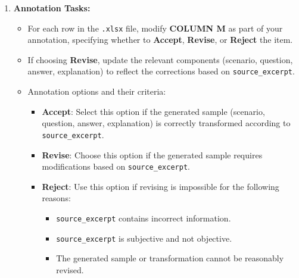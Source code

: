 \documentclass[11pt]{article}
\begin{document}
\begin{enumerate}
    \item \textbf{Annotation Tasks:}
    \begin{itemize}
        \item For each row in the \texttt{.xlsx} file, modify \textbf{COLUMN M} as part of your annotation, specifying whether to \textbf{Accept}, \textbf{Revise}, or \textbf{Reject} the item.
        \item If choosing \textbf{Revise}, update the relevant components (scenario, question, answer, explanation) to reflect the corrections based on \texttt{source\_excerpt}.
        \item Annotation options and their criteria:
        \begin{itemize}
            \item \textbf{Accept}: Select this option if the generated sample (scenario, question, answer, explanation) is correctly transformed according to \texttt{source\_excerpt}.
            \item \textbf{Revise}: Choose this option if the generated sample requires modifications based on \texttt{source\_excerpt}.
            \item \textbf{Reject}: Use this option if revising is impossible for the following reasons:
            \begin{itemize}
                \item \texttt{source\_excerpt} contains incorrect information.
                \item \texttt{source\_excerpt} is subjective and not objective.
                \item The generated sample or transformation cannot be reasonably revised.
            \end{itemize}
        \end{itemize}
    \end{itemize}
\end{enumerate}

\end{document}
